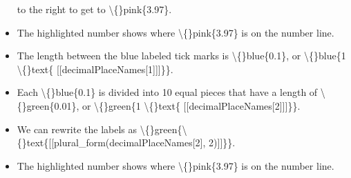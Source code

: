 \documentclass{article}
\begin{document}
\begin{itemize}
                        to the right to get to \textbackslash\{\}pink\{3.97\}.
  \item The highlighted number shows where \textbackslash\{\}pink\{3.97\} is on the number line.
  \item The length between the blue labeled tick marks is \textbackslash\{\}blue\{0.1\},
                    or \textbackslash\{\}blue\{1 \textbackslash\{\}text\{ [[decimalPlaceNames[1]]]\}\}.
  \item Each \textbackslash\{\}blue\{0.1\} is divided into 10 equal pieces
                    that have a length of \textbackslash\{\}green\{0.01\},
                    or \textbackslash\{\}green\{1 \textbackslash\{\}text\{ [[decimalPlaceNames[2]]]\}\}.
  \item We can rewrite the labels as \textbackslash\{\}green\{\textbackslash\{\}text\{[[plural\_form(decimalPlaceNames[2], 2)]]\}\}.
  \item The highlighted number shows where \textbackslash\{\}pink\{3.97\} is on the number line.
\end{itemize}
\end{document}
